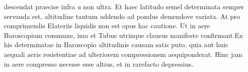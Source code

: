                              descendat praecise infra \textit{a} non  ultra. Et haec latitudo semel determinata  semper servanda est, altitudine tantum addendo  ad pondus demendove variata. At pro comprimendis Elateriis\protect{} liquidis non est opus hac cautione. Ut  in aere Baroscopium\protect{} commune, imo et Tubus utrinque  clausus manifeste confirmant.\pend \pstart  Ex his determinatae in Baroscopio\protect{}  altitudinis causam satis  puto, quia  aut  huic aequali aeris resistentiae ad ulteriorem compressionem  aequiponderat. Hinc jam in aere compresso necesse  esse altius, et in rarefacto depressius. 
                             \pend 
                    